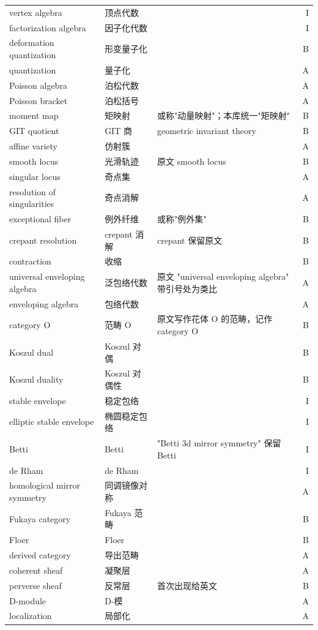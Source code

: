 \begin{longtable}{@{}>{\raggedright\arraybackslash}p{}>{\raggedright\arraybackslash}p{}>{\raggedright\arraybackslash}p{}@{\quad}r@{}}
vertex algebra & 顶点代数 &  & I\\
factorization algebra & 因子化代数 &  & I\\
deformation quantization & 形变量子化 &  & B\\
quantization & 量子化 &  & A\\
Poisson algebra & 泊松代数 &  & A\\
Poisson bracket & 泊松括号 &  & A\\
moment map & 矩映射 & 或称"动量映射"；本库统一"矩映射" & B\\
GIT quotient & GIT 商 & geometric invariant theory & B\\
affine variety & 仿射簇 &  & A\\
smooth locus & 光滑轨迹 & 原文 smooth locus & B\\
singular locus & 奇点集 &  & A\\
resolution of singularities & 奇点消解 &  & A\\
exceptional fiber & 例外纤维 & 或称"例外集" & B\\
crepant resolution & crepant 消解 & crepant 保留原文 & B\\
contraction & 收缩 &  & B\\
universal enveloping algebra & 泛包络代数 & 原文 "universal enveloping algebra" 带引号处为类比 & A\\
enveloping algebra & 包络代数 &  & A\\
category O & 范畴 O & 原文写作花体 O 的范畴，记作 category O & B\\
Koszul dual & Koszul 对偶 &  & B\\
Koszul duality & Koszul 对偶性 &  & B\\
stable envelope & 稳定包络 &  & I\\
elliptic stable envelope & 椭圆稳定包络 &  & I\\
Betti & Betti & "Betti 3d mirror symmetry" 保留 Betti & I\\
de Rham & de Rham &  & I\\
homological mirror symmetry & 同调镜像对称 &  & A\\
Fukaya category & Fukaya 范畴 &  & B\\
Floer & Floer &  & B\\
derived category & 导出范畴 &  & A\\
coherent sheaf & 凝聚层 &  & A\\
perverse sheaf & 反常层 & 首次出现给英文 & B\\
D-module & D-模 &  & A\\
localization & 局部化 &  & A\\

\end{longtable}
